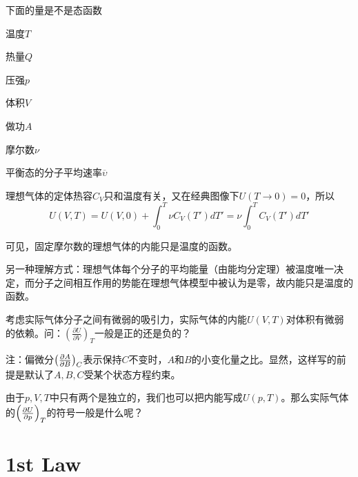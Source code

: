 \documentclass[CJK]{beamer}
\begin{document}
\begin{frame}
\bch
下面的量是不是态函数
\bitem
\item{温度$T$}
\item{热量$Q$}
\item{压强$p$}
\item{体积$V$}
\item{做功$A$}
\item{摩尔数$\nu$}
\item{平衡态的分子平均速率$\overline{\upsilon}$}
\eitem
\ech
\end{frame}

\begin{frame}
\bch

理想气体的定体热容$C_V$只和温度有关，又在经典图像下$U(T\rightarrow 0) = 0$，所以
$$ U(V, T) = U(V, 0) + \int_0^T \nu C_V(T') dT' =\nu  \int_0^T C_V(T') dT'  $$

可见，固定摩尔数的理想气体的内能只是温度的函数。

\skiplines

另一种理解方式：理想气体每个分子的平均能量（由能均分定理）被温度唯一决定，而分子之间相互作用的势能在理想气体模型中被认为是零，故内能只是温度的函数。

\ech
\end{frame}



\begin{frame}
\bch
{}

考虑实际气体分子之间有微弱的吸引力，实际气体的内能$U(V,T)$对体积有微弱的依赖。问：$\left(\frac{\partial U}{\partial V}\right)_T$一般是正的还是负的？

\skiplines

注：偏微分$\left(\frac{\partial A}{\partial B}\right)_{C}$表示保持$C$不变时，$A$和$B$的小变化量之比。显然，这样写的前提是默认了$A,B,C$受某个状态方程约束。
\ech
\end{frame}


\begin{frame}
\bch
{}

由于$p, V, T$中只有两个是独立的，我们也可以把内能写成$U(p, T)$。那么实际气体的$\left(\frac{\partial U}{\partial p}\right)_{T}$的符号一般是什么呢？

\ech
\end{frame}


\section{1st Law}
\end{document}
